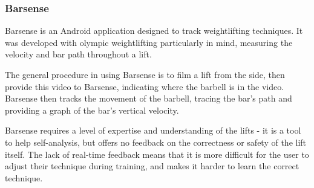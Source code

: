 \subsubsection{Barsense}

Barsense\cite{barsense} is an Android application designed to track weightlifting techniques. It was developed with olympic weightlifting particularly in mind, measuring the velocity and bar path throughout a lift.

The general procedure in using Barsense is to film a lift from the side, then provide this video to Barsense, indicating where the barbell is in the video. Barsense then tracks the movement of the barbell, tracing the bar's path and providing a graph of the bar's vertical velocity.

Barsense requires a level of expertise and understanding of the lifts - it is a tool to help self-analysis, but offers no feedback on the correctness or safety of the lift itself. The lack of real-time feedback means that it is more difficult for the user to adjust their technique during training, and makes it harder to learn the correct technique.